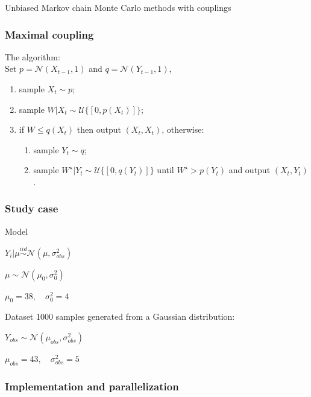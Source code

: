 \documentclass{beamer}
\begin{document}
\begin{section}{Unbiased Markov chain Monte Carlo methods with couplings}
	\begin{frame}
		\frametitle{Maximal coupling}
		The algorithm:\\
		
		Set $p = \mathcal{N}(X_{t-1},1)$ and $q = \mathcal{N}(Y_{t-1},1)$,
		\begin{enumerate}
			\item sample $X_t \sim p$;
			\item sample $W|X_t \sim \mathcal{U}\{[0,p(X_t)]\}$;
			\item if $W\leq q(X_t)$ then output $(X_t,X_t)$, otherwise:
			\begin{enumerate}
				\item sample $Y_t \sim q$;
				\item sample $W^\star | Y_t \sim \mathcal{U}\{[0, q(Y_t)]\}$ 
				until $W^\star > p(Y_t)$ and output $(X_t,Y_t)$.
			\end{enumerate}
		\end{enumerate}
	\end{frame}

	\begin{frame}
		\frametitle{Study case}
		
		\begin{block}{Model}
			\begin{center}
				$ Y_i | \mu \overset{iid}{\sim} \mathcal{N}(\mu, \sigma_{obs} ^2) $\\
				
				\vspace{0.3cm}
				
				$ \mu  \sim \mathcal{N}(\mu_0, \sigma_0^2)$
				
				$\mu_0 = 38, \quad \sigma^2_0 = 4$
			\end{center}
		\end{block}
		
		\begin{block}{Dataset}
			1000 samples generated from a Gaussian distribution:
			\begin{center}
				$
				Y_{obs} \sim \mathcal{N}(\mu_{obs}, \sigma_{obs} ^2)
				$
				
				$
				\mu_{obs} = 43, \quad
				\sigma_{obs} ^2 = 5
				$
			\end{center}
		\end{block}
	\end{frame}

	\begin{frame}
		\frametitle{Implementation and parallelization}
	\end{frame}


\end{section}
\end{document}
